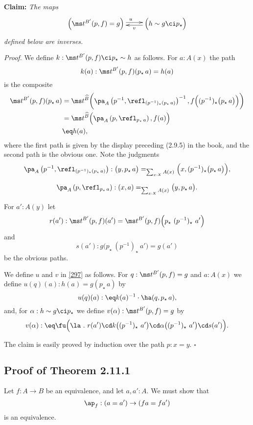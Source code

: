 \documentclass[12pt]{article}
\begin{document}
\nn\textbf{Claim:} \emph{The maps}
\begin{equation}\label{297}
\xymatrix{
\Big(\ms t^{B'}(p,f)=g\Big)\ar@<2pt>[r]^(.5)u&\Big(h\sim g\ci p_\star\Big)\ar@<2pt>[l]^(.45)v}
\end{equation}
\emph{defined below are inverses.}

\nn\emph{Proof.} We define $k:\ms t^{B'}(p,f)\ci p_\star\sim h$ as follows. For $a:A(x)$ the path 
$$
k(a):\ms t^{B'}(p,f)(p_\star\,a)=h(a)
$$ 
is the composite 
\begin{align*}
\ms t^{B'}(p,f)(p_\star\,a)&=\ms t^{\widehat B}\bigg(\pa_A\left(p^{-1},\refl_{(p^{-1})_\star(p_\star\,a)}\right)^{-1},f\Big((p^{-1})_\star\big(p_\star\,a\big)\Big)\bigg)\\ 
&=\ms t^{\widehat B}\Big(\pa_A\left(p,\refl_{p_\star\,a}\right),f(a)\Big)\\
&\eq h(a),
\end{align*} 
where the first path is given by the display preceding (2.9.5) in the book, and the second path is the obvious one. Note the judgments
$$
\pa_A\left(p^{-1},\refl_{(p^{-1})_\star(p_\star\,a)}\right):\big(y,p_\star\,a\big)=_{\sum_{x:X}A(x)}\Big(x,(p^{-1})_\star\big(p_\star\,a\big)\Big),
$$ 

$$
\pa_A\left(p,\refl_{p_\star\,a}\right):(x,a)=_{\sum_{x:X}A(x)}\big(y,p_\star\,a\big).
$$  

For $a':A(y)$ let 
$$
r(a'):\ms t^{B'}(p,f)(a')=\ms t^{B'}(p,f)\Big(p_\star\ (p^{-1})_\star\ a'\Big)
$$ 
and 
$$
s(a'):g\Big(p_\star\ (p^{-1})_\star\ a'\Big)=g(a')
$$ 
be the obvious paths. 

We define $u$ and $v$ in \eqref{297} as follows. For $q:\ms t^{B'}(p,f)=g$ and $a:A(x)$ we define $u(q)(a):h(a)=g(p_\star\,a)$ by 
$$ 
u(q)(a):\eq k(a)^{-1}\cdot\ha(q,p_\star\,a), 
$$ 
and, for $\alpha:h\sim g\ci p_\star$ we define $v(\alpha):\ms t^{B'}(p,f)=g$ by 
$$
v(\alpha):\eq\fu\Big(\la\ .\ r(a')\cd k\big((p^{-1})_\star\ a'\big)\cd\alpha\big((p^{-1})_\star\ a'\big)\cd s(a')\Big).
$$ 

The claim is easily proved by induction over the path $p:x=y$. $\square$


\subsection{Proof of Theorem 2.11.1}\label{2111}

Let $f:A\to B$ be an equivalence, and let $a,a':A$. We must show that 
$$
\ap_f:(a=a')\to (fa=fa')
$$ 
is an equivalence.
\end{document}
